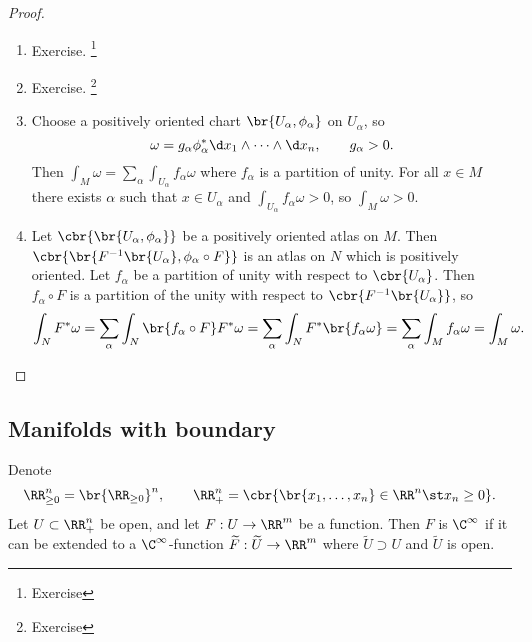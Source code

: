 \begin{proof}
\hfill
\begin{enumerate}
\item Exercise. \footnote{Exercise}
\item Exercise. \footnote{Exercise}
\item Choose a positively oriented chart $ \br{U_\alpha, \phi_\alpha} $ on $ U_\alpha $, so
$$ \omega = g_\alpha\phi_\alpha^*\d x_1 \wedge \dots \wedge \d x_n, \qquad g_\alpha > 0. $$
Then $ \int_M \omega = \sum_\alpha \int_{U_\alpha} f_\alpha\omega $ where $ f_\alpha $ is a partition of unity. For all $ x \in M $ there exists $ \alpha $ such that $ x \in U_\alpha $ and $ \int_{U_\alpha} f_\alpha\omega > 0 $, so $ \int_M \omega > 0 $.
\item Let $ \cbr{\br{U_\alpha, \phi_\alpha}} $ be a positively oriented atlas on $ M $. Then $ \cbr{\br{F^{-1}\br{U_\alpha}, \phi_\alpha \circ F}} $ is an atlas on $ N $ which is positively oriented. Let $ f_\alpha $ be a partition of unity with respect to $ \cbr{U_\alpha} $. Then $ f_\alpha \circ F $ is a partition of the unity with respect to $ \cbr{F^{-1}\br{U_\alpha}} $, so
$$ \int_N F^*\omega = \sum_\alpha \int_N \br{f_\alpha \circ F}F^*\omega = \sum_\alpha \int_N F^*\br{f_\alpha\omega} = \sum_\alpha \int_M f_\alpha\omega = \int_M \omega. $$
\end{enumerate}
\end{proof}

\pagebreak

\subsection{Manifolds with boundary}

Denote
$$ \RR_{\ge 0}^n = \br{\RR_{\ge 0}}^n, \qquad \RR_+^n = \cbr{\br{x_1, \dots, x_n} \in \RR^n \st x_n \ge 0}. $$
Let $ U \subset \RR_+^n $ be open, and let $ F : U \to \RR^m $ be a function. Then $ F $ is $ \C^\infty $ if it can be extended to a $ \C^\infty $-function $ \widetilde{F} : \widetilde{U} \to \RR^m $ where $ \widetilde{U} \supset U $ and $ \widetilde{U} $ is open.


